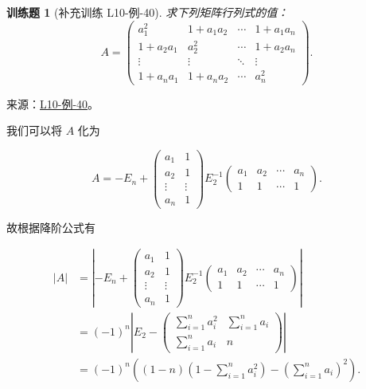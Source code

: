 \documentclass[12pt,fontset=fandol]{ctexart}
\newtheorem{exercise}{训练题}[section]
\begin{document}
\begin{exercise}[补充训练 L10-例-40]\label{prob:L10-例-40}
求下列矩阵行列式的值：
            \[A=\begin{pmatrix}
                    a_1^2    & 1+a_1a_2   & \cdots & 1+a_1a_n \\
                    1+a_2a_1 & a_2^2    & \cdots & 1+a_2a_n \\
                    \vdots   & \vdots   & \ddots & \vdots   \\
                    1+a_na_1 & 1+a_na_2 & \cdots & a_n^2
                \end{pmatrix}.\]
\end{exercise}
\noindent 来源：\href{https://github.com/yhwu-is/Linear-Algebra-Left-Undone/blob/new/%E8%AE%B2%E4%B9%89/%E4%B8%93%E9%A2%98/10%20%E8%A1%8C%E5%88%97%E5%BC%8F.tex}{L10-例-40}。
\begin{solve}
我们可以将 $A$ 化为

            \[ A = -E_n + \begin{pmatrix}
                    a_1 & 1 \\ a_2 & 1 \\ \vdots & \vdots \\ a_n & 1
                \end{pmatrix} E_2^{-1} \begin{pmatrix}
                    a_1 & a_2 & \cdots & a_n \\ 1 & 1 & \cdots & 1
                \end{pmatrix}. \]

            故根据降阶公式有

            \begin{align*}
                |A| & = \left\vert-E_n +
                \begin{pmatrix}
                    a_1 & 1 \\ a_2 & 1 \\ \vdots & \vdots \\ a_n & 1
                \end{pmatrix} E_2^{-1}
                \begin{pmatrix}
                    a_1 & a_2 & \cdots & a_n \\ 1 & 1 & \cdots & 1
                \end{pmatrix}\right\vert                                                                       \\
                    & = (-1)^n \left|E_2 -
                \begin{pmatrix}
                    \sum\limits_{i=1}^n a_i^2 & \sum\limits_{i=1}^n a_i \\[2ex]
                    \sum\limits_{i=1}^n a_i   & n
                \end{pmatrix}\right|                                                          \\
                    & = (-1)^n \left((1-n)\left(1-\sum\limits_{i=1}^n a_i^2\right) - \left(\sum\limits_{i=1}^n a_i\right)^2\right).
            \end{align*}
\end{solve}
\end{document}
